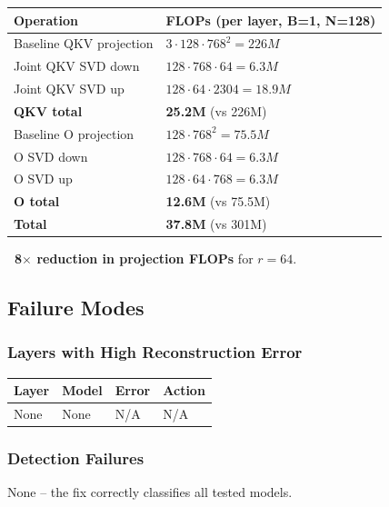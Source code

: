 \begin{table}[H]
\centering
\small
\begin{tabular}{ll}
\toprule
\textbf{Operation} & \textbf{FLOPs (per layer, B=1, N=128)} \\
\midrule
Baseline QKV projection & $3 \cdot 128 \cdot 768^2 = 226M$ \\
Joint QKV SVD down & $128 \cdot 768 \cdot 64 = 6.3M$ \\
Joint QKV SVD up & $128 \cdot 64 \cdot 2304 = 18.9M$ \\
\textbf{QKV total} & \textbf{25.2M} (vs 226M) \\
Baseline O projection & $128 \cdot 768^2 = 75.5M$ \\
O SVD down & $128 \cdot 768 \cdot 64 = 6.3M$ \\
O SVD up & $128 \cdot 64 \cdot 768 = 6.3M$ \\
\textbf{O total} & \textbf{12.6M} (vs 75.5M) \\
\textbf{Total} & \textbf{37.8M} (vs 301M) \\
\bottomrule
\end{tabular}
\end{table}

\textbf{~8$\times$ reduction in projection FLOPs} for $r = 64$.

\subsection{Failure Modes}

\subsubsection{Layers with High Reconstruction Error}

\begin{table}[H]
\centering
\small
\begin{tabular}{llll}
\toprule
\textbf{Layer} & \textbf{Model} & \textbf{Error} & \textbf{Action} \\
\midrule
None & None & N/A & N/A \\
\bottomrule
\end{tabular}
\end{table}

\subsubsection{Detection Failures}

None -- the fix correctly classifies all tested models.

